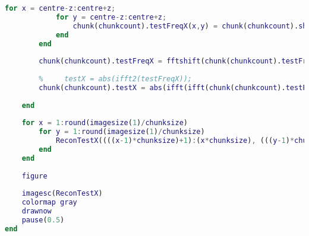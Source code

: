 \begin{lstlisting}[language=Matlab, label = lst:chunk_comp]
        for x = centre-z:centre+z;
            for y = centre-z:centre+z;
                chunk(chunkcount).testFreqX(x,y) = chunk(chunkcount).shiftedFreqX(x,y);
            end
        end
        
        chunk(chunkcount).testFreqX = fftshift(chunk(chunkcount).testFreqX);
        
        %     testX = abs(ifft2(testFreqX));
        chunk(chunkcount).testX = abs(ifft(ifft(chunk(chunkcount).testFreqX)')');
        
    end
    
    for x = 1:round(imagesize(1)/chunksize)
        for y = 1:round(imagesize(1)/chunksize)
            ReconTestX((((x-1)*chunksize)+1):(x*chunksize), (((y-1)*chunksize)+1):(y*chunksize)) = chunk(x,y).testX;
        end
    end
    
    figure
    
    imagesc(ReconTestX)
    colormap gray
    drawnow
    pause(0.5)
end
\end{lstlisting}